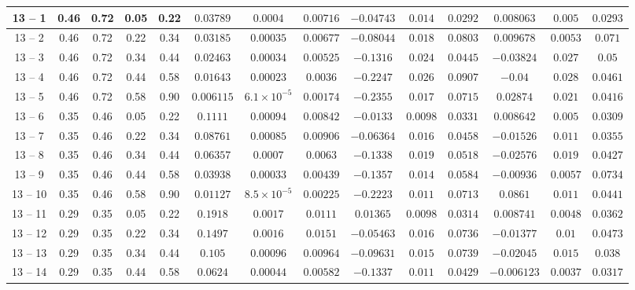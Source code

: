 \begin{longtable}{|*{14}{c|}}
\hline
13 -- 1 & 0.46 & 0.72 & 0.05 & 0.22 & $0.03789$ & $0.0004$ & $0.00716$ & $-0.04743$ & $0.014$ & $0.0292$ & $0.008063$ & $0.005$ & $0.0293$ \\
\hline
13 -- 2 & 0.46 & 0.72 & 0.22 & 0.34 & $0.03185$ & $0.00035$ & $0.00677$ & $-0.08044$ & $0.018$ & $0.0803$ & $0.009678$ & $0.0053$ & $0.071$ \\
\hline
13 -- 3 & 0.46 & 0.72 & 0.34 & 0.44 & $0.02463$ & $0.00034$ & $0.00525$ & $-0.1316$ & $0.024$ & $0.0445$ & $-0.03824$ & $0.027$ & $0.05$ \\
\hline
13 -- 4 & 0.46 & 0.72 & 0.44 & 0.58 & $0.01643$ & $0.00023$ & $0.0036$ & $-0.2247$ & $0.026$ & $0.0907$ & $-0.04$ & $0.028$ & $0.0461$ \\
\hline
13 -- 5 & 0.46 & 0.72 & 0.58 & 0.90 & $0.006115$ & $6.1\times 10^{-5}$ & $0.00174$ & $-0.2355$ & $0.017$ & $0.0715$ & $0.02874$ & $0.021$ & $0.0416$ \\
\hline
13 -- 6 & 0.35 & 0.46 & 0.05 & 0.22 & $0.1111$ & $0.00094$ & $0.00842$ & $-0.0133$ & $0.0098$ & $0.0331$ & $0.008642$ & $0.005$ & $0.0309$ \\
\hline
13 -- 7 & 0.35 & 0.46 & 0.22 & 0.34 & $0.08761$ & $0.00085$ & $0.00906$ & $-0.06364$ & $0.016$ & $0.0458$ & $-0.01526$ & $0.011$ & $0.0355$ \\
\hline
13 -- 8 & 0.35 & 0.46 & 0.34 & 0.44 & $0.06357$ & $0.0007$ & $0.0063$ & $-0.1338$ & $0.019$ & $0.0518$ & $-0.02576$ & $0.019$ & $0.0427$ \\
\hline
13 -- 9 & 0.35 & 0.46 & 0.44 & 0.58 & $0.03938$ & $0.00033$ & $0.00439$ & $-0.1357$ & $0.014$ & $0.0584$ & $-0.00936$ & $0.0057$ & $0.0734$ \\
\hline
13 -- 10 & 0.35 & 0.46 & 0.58 & 0.90 & $0.01127$ & $8.5\times 10^{-5}$ & $0.00225$ & $-0.2223$ & $0.011$ & $0.0713$ & $0.0861$ & $0.011$ & $0.0441$ \\
\hline
13 -- 11 & 0.29 & 0.35 & 0.05 & 0.22 & $0.1918$ & $0.0017$ & $0.0111$ & $0.01365$ & $0.0098$ & $0.0314$ & $0.008741$ & $0.0048$ & $0.0362$ \\
\hline
13 -- 12 & 0.29 & 0.35 & 0.22 & 0.34 & $0.1497$ & $0.0016$ & $0.0151$ & $-0.05463$ & $0.016$ & $0.0736$ & $-0.01377$ & $0.01$ & $0.0473$ \\
\hline
13 -- 13 & 0.29 & 0.35 & 0.34 & 0.44 & $0.105$ & $0.00096$ & $0.00964$ & $-0.09631$ & $0.015$ & $0.0739$ & $-0.02045$ & $0.015$ & $0.038$ \\
\hline
13 -- 14 & 0.29 & 0.35 & 0.44 & 0.58 & $0.0624$ & $0.00044$ & $0.00582$ & $-0.1337$ & $0.011$ & $0.0429$ & $-0.006123$ & $0.0037$ & $0.0317$ \\

\end{longtable}
